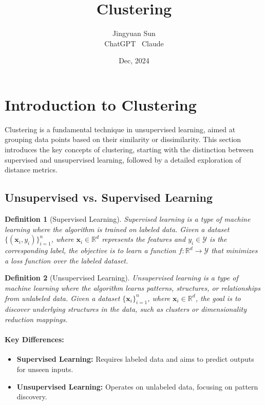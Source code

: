 \documentclass[12pt,a4paper]{article}
\title{\textbf{Clustering}}
\author{Jingyuan Sun \\ ChatGPT \ Claude}
\date{Dec, 2024}
\newtheorem{definition}{Definition}
\begin{document}
\maketitle


\section{Introduction to Clustering}
Clustering is a fundamental technique in unsupervised learning, aimed at grouping data points based on their similarity or dissimilarity. This section introduces the key concepts of clustering, starting with the distinction between supervised and unsupervised learning, followed by a detailed exploration of distance metrics.

\subsection{Unsupervised vs. Supervised Learning}
\begin{definition}[Supervised Learning]
Supervised learning is a type of machine learning where the algorithm is trained on labeled data. Given a dataset $\{(\mathbf{x}_i, y_i)\}_{i=1}^n$, where $\mathbf{x}_i \in \mathbb{R}^d$ represents the features and $y_i \in \mathcal{Y}$ is the corresponding label, the objective is to learn a function $f: \mathbb{R}^d \to \mathcal{Y}$ that minimizes a loss function over the labeled dataset.
\end{definition}

\begin{definition}[Unsupervised Learning]
Unsupervised learning is a type of machine learning where the algorithm learns patterns, structures, or relationships from unlabeled data. Given a dataset $\{\mathbf{x}_i\}_{i=1}^n$, where $\mathbf{x}_i \in \mathbb{R}^d$, the goal is to discover underlying structures in the data, such as clusters or dimensionality reduction mappings.
\end{definition}

\paragraph{Key Differences:}
\begin{itemize}
    \item \textbf{Supervised Learning:} Requires labeled data and aims to predict outputs for unseen inputs.
    \item \textbf{Unsupervised Learning:} Operates on unlabeled data, focusing on pattern discovery.
\end{itemize}
\end{document}
